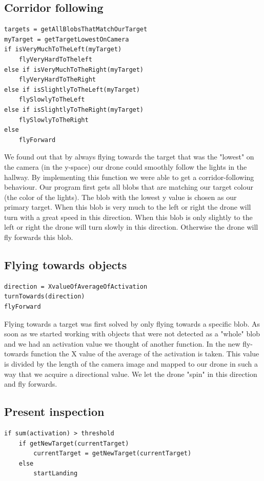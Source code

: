 \documentclass[a4paper,10pt]{article}
\begin{document}
\subsection{Corridor following} 
\begin{verbatim}
targets = getAllBlobsThatMatchOurTarget
myTarget = getTargetLowestOnCamera
if isVeryMuchToTheLeft(myTarget)
    flyVeryHardToTheleft
else if isVeryMuchToTheRight(myTarget)
    flyVeryHardToTheRight
else if isSlightlyToTheLeft(myTarget)
    flySlowlyToTheLeft
else if isSlightlyToTheRight(myTarget)
    flySlowlyToTheRight
else
    flyForward
\end{verbatim}

We found out that by always flying towards the target that was the "lowest" on the camera (in the y-space) our drone could smoothly follow the lights in the hallway. 
By implementing this function we were able to get a corridor-following behaviour. 
Our program first gets all blobs that are matching our target colour (the color of the lights). 
The blob with the lowest y value is chosen as our primary target. 
When this blob is very much to the left or right the drone will turn with a great speed in this direction. 
When this blob is only slightly to the left or right the drone will turn slowly in this direction. 
Otherwise the drone will fly forwards this blob. 

\subsection{Flying towards objects\label{flytowards}}
\begin{verbatim}
direction = XvalueOfAverageOfActivation
turnTowards(direction)
flyForward
\end{verbatim}

Flying towards a target was first solved by only flying towards a specific blob. 
As soon as we started working with objects that were not detected as a "whole" blob and we had an activation value we thought of another function. 
In the new fly-towards function the X value of the average of the activation is taken.
This value is divided by the length of the camera image and mapped to our drone in such a way that we acquire a directional value. 
We let the drone "spin" in this direction and fly forwards. 

\subsection{Present inspection\label{inspect}}
\begin{verbatim}
if sum(activation) > threshold
    if getNewTarget(currentTarget)
        currentTarget = getNewTarget(currentTarget)
    else
        startLanding
\end{verbatim}
\end{document}
